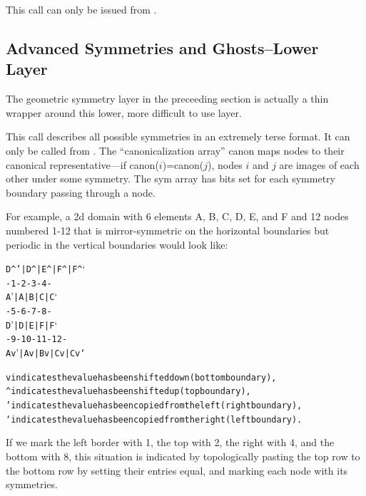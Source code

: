 This call can only be issued from .



\subsection{Advanced Symmetries and Ghosts--Lower Layer}

The geometric symmetry layer in the preceeding section is actually
a thin wrapper around this lower, more difficult to use layer.


This call describes all possible symmetries in an extremely terse format.
It can only be called from .
The ``canonicalization array'' canon maps nodes to their canonical 
representative---if canon($i$)=canon($j$), nodes $i$ and $j$ are 
images of each other under some symmetry.  The sym array has bits set
for each symmetry boundary passing through a node.

For example, a 2d domain with 6 elements A, B, C, D, E, and F and 12 
nodes numbered 1-12 that is 
mirror-symmetric on the horizontal boundaries but periodic in the 
vertical boundaries would look like:

\begin{alltt}
   D^'|  D^ |  E^ |  F^ |  F^`
   -  1  -  2  -  3  -  4  -
   A' |  A  |  B  |  C  |  C`
   -  5  -  6  -  7  -  8  -
   D' |  D  |  E  |  F  |  F`
   -  9  - 10  -  11 -  12 -
   Av'|  Av |  Bv |  Cv |  Cv`

  v indicates the value has been shifted down (bottom boundary),
  ^ indicates the value has been shifted up (top boundary),
  ' indicates the value has been copied from the left (right boundary),
  ` indicates the value has been copied from the right (left boundary).
\end{alltt}

If we mark the left border with 1, the top with 2, the right with 4,
and the bottom with 8, this situation is indicated by topologically pasting the 
top row to the bottom row by setting their  entries equal, and 
marking each node with its symmetries.

